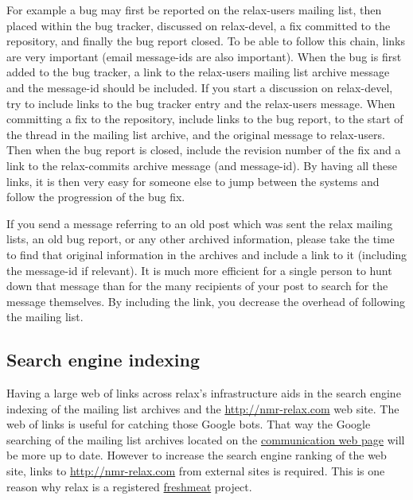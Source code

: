 For example a bug may first be reported on the relax-users mailing list, then placed within the bug tracker, discussed on relax-devel, a fix committed to the repository, and finally the bug report closed.  To be able to follow this chain, links are very important (email message-ids are also important).  When the bug is first added to the bug tracker, a link to the relax-users mailing list archive message and the message-id should be included.  If you start a discussion on relax-devel, try to include links to the bug tracker entry and the relax-users message.  When committing a fix to the repository, include links to the bug report, to the start of the thread in the mailing list archive, and the original message to relax-users.  Then when the bug report is closed, include the revision number of the fix and a link to the relax-commits archive message (and message-id).  By having all these links, it is then very easy for someone else to jump between the systems and follow the progression of the bug fix.

If you send a message referring to an old post which was sent the relax mailing lists, an old bug report, or any other archived information, please take the time to find that original information in the archives and include a link to it (including the message-id if relevant).  It is much more efficient for a single person to hunt down that message than for the many recipients of your post to search for the message themselves.  By including the link, you decrease the overhead of following the mailing list.



\subsection{Search engine indexing}

Having a large web of links across relax's infrastructure aids in the search engine indexing of the mailing list archives and the \href{http://nmr-relax.com}{http://nmr-relax.com} web site.  The web of links is useful for catching those Google bots.  That way the Google searching of the mailing list archives located on the \href{http://nmr-relax.com/communication.html}{communication web page} will be more up to date.  However to increase the search engine ranking of the web site, links to \href{http://nmr-relax.com}{http://nmr-relax.com} from external sites is required.  This is one reason why relax is a registered \href{http://freshmeat.net/projects/nmr-relax}{freshmeat} project.


